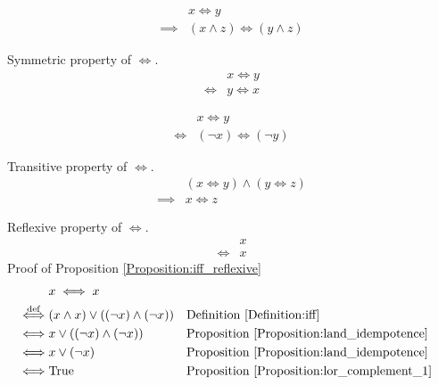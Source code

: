 \begin{prop}
\label{Proposition:iff_land}
\begin{align*}
& x \iff y \\
\implies & (x \land z) \iff (y \land z)
\end{align*}
\end{prop}

\begin{prop}
\label{Proposition:iff_symmetric}
Symmetric property of $\iff$.
\begin{align*}
& x \iff y \\
\iff & y \iff x
\end{align*}
\end{prop}

\begin{prop}
\label{Proposition:iff_contrapositive}
\begin{align*}
& x \iff y \\
\iff & (\lnot x) \iff (\lnot y)
\end{align*}
\end{prop}

\begin{prop}
\label{Proposition:iff_transitive}
Transitive property of $\iff$.
\begin{align*}
& (x \iff y) \land (y \iff z) \\
\implies & x \iff z
\end{align*}
\end{prop}

\begin{prop}
\label{Proposition:iff_reflexive}
Reflexive property of $\iff$.
\begin{align*}
& x \\
\iff & x
\end{align*}
Proof of Proposition \ref{Proposition:iff_reflexive}
\begin{align*}
& x \iff x \\
\overset{\operatorname{def}}{\iff} & (x \land x) \lor ((\lnot x) \land (\lnot x))
&& \text{Definition \ref{Definition:iff}} \\
\iff & x \lor ((\lnot x) \land (\lnot x))
&& \text{Proposition \ref{Proposition:land_idempotence}} \\
\iff & x \lor (\lnot x)
&& \text{Proposition \ref{Proposition:land_idempotence}} \\
\iff & \text{True}
&& \text{Proposition \ref{Proposition:lor_complement_1}} \\
\end{align*}
\end{prop}

